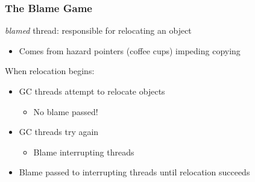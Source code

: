 \documentclass{beamer}
\newcommand{\linespace}{\vskip 0.25cm}
\begin{document}
\begin{frame}

\frametitle{The Blame Game}


\emph{blamed} thread: responsible for relocating an object
\begin{itemize}
\item Comes from hazard pointers (coffee cups) impeding copying
\end{itemize}

\linespace
\linespace

When relocation begins:
\begin{itemize}
\item GC threads attempt to relocate objects
\begin{itemize}
\item No blame passed!
\end{itemize}
\item GC threads try again
\begin{itemize}
\item Blame interrupting threads
\end{itemize}
\item Blame passed to interrupting threads until relocation succeeds
\end{itemize}

\end{frame}
\end{document}
